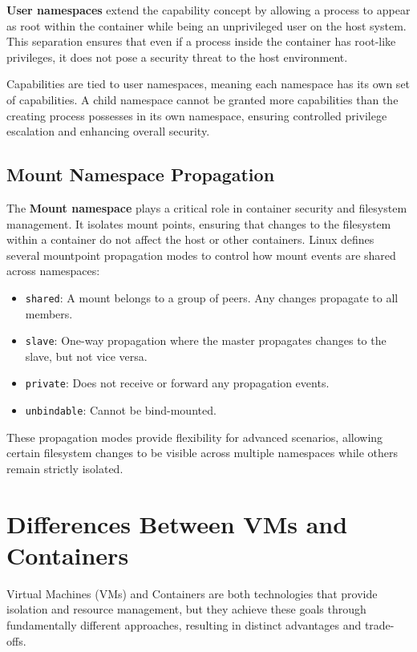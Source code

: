 \textbf{User namespaces} extend the capability concept by allowing a process to appear as root within the container while being an unprivileged user on the host system. This separation ensures that even if a process inside the container has root-like privileges, it does not pose a security threat to the host environment.

Capabilities are tied to user namespaces, meaning each namespace has its own set of capabilities. A child namespace cannot be granted more capabilities than the creating process possesses in its own namespace, ensuring controlled privilege escalation and enhancing overall security.

\subsection{Mount Namespace Propagation}

The \textbf{Mount namespace} plays a critical role in container security and filesystem management. It isolates mount points, ensuring that changes to the filesystem within a container do not affect the host or other containers. Linux defines several mountpoint propagation modes to control how mount events are shared across namespaces:
\begin{itemize}
    \item \texttt{shared}: A mount belongs to a group of peers. Any changes propagate to all members.
    \item \texttt{slave}: One-way propagation where the master propagates changes to the slave, but not vice versa.
    \item \texttt{private}: Does not receive or forward any propagation events.
    \item \texttt{unbindable}: Cannot be bind-mounted.
\end{itemize}

These propagation modes provide flexibility for advanced scenarios, allowing certain filesystem changes to be visible across multiple namespaces while others remain strictly isolated.

\section{Differences Between VMs and Containers}

Virtual Machines (VMs) and Containers are both technologies that provide isolation and resource management, but they achieve these goals through fundamentally different approaches, resulting in distinct advantages and trade-offs.

